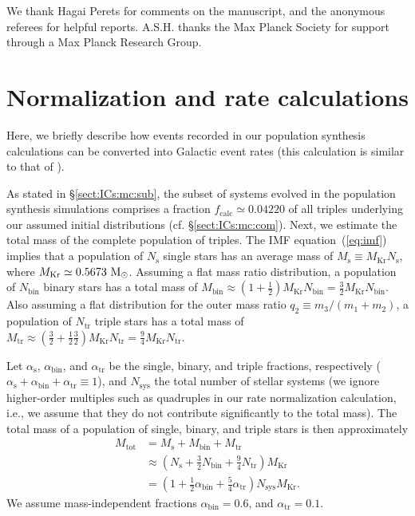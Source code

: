 \documentclass[twocolumn,appendixfloats,tighten]{aastex631}
\def\msun{{\rm\,M_\odot}}
\newcommand{\eq}{equation}
\begin{document}
\begin{acknowledgements} 
We thank Hagai Perets for comments on the manuscript, and the anonymous referees for helpful reports. A.S.H. thanks the Max Planck Society for support through a Max Planck Research Group.
\end{acknowledgements}




\appendix

\section{Normalization and rate calculations}
\label{app:norm}
Here, we briefly describe how events recorded in our population synthesis calculations can be converted into Galactic event rates (this calculation is similar to that of \citealt{2021arXiv210713620H}).

As stated in \S\ref{sect:ICs:mc:sub}, the subset of systems evolved in the population synthesis simulations comprises a fraction $f_\mathrm{calc} \simeq 0.04220$ of all triples underlying our assumed initial distributions (cf. \S\ref{sect:ICs:mc:com}). Next, we estimate the total mass of the complete population of triples. The IMF \eq~(\ref{eq:imf}) implies that a population of $N_\mathrm{s}$ single stars has an average mass of $M_\mathrm{s} \equiv M_\mathrm{Kr} N_\mathrm{s}$, where $M_\mathrm{Kr} \simeq 0.5673 \, \msun$. Assuming a flat mass ratio distribution, a population of $N_\mathrm{bin}$ binary stars has a total mass of $M_\mathrm{bin} \approx (1+\frac{1}{2} ) M_\mathrm{Kr} N_\mathrm{bin} = \frac{3}{2} M_\mathrm{Kr} N_\mathrm{bin}$. Also assuming a flat distribution for the outer mass ratio $q_2 \equiv m_3/(m_1+m_2)$, a population of $N_\mathrm{tr}$ triple stars has a total mass of $M_\mathrm{tr} \approx (\frac{3}{2} + \frac{1}{2} \frac{3}{2} ) M_\mathrm{Kr} N_\mathrm{tr} = \frac{9}{4} M_\mathrm{Kr} N_\mathrm{tr}$. 

Let $\alpha_\mathrm{s}$, $\alpha_\mathrm{bin}$, and $\alpha_\mathrm{tr}$ be the single, binary, and triple fractions, respectively ($\alpha_\mathrm{s} + \alpha_\mathrm{bin} + \alpha_\mathrm{tr} \equiv 1$), and $N_\mathrm{sys}$ the total number of stellar systems (we ignore higher-order multiples such as quadruples in our rate normalization calculation, i.e., we assume that they do not contribute significantly to the total mass). The total mass of a population of single, binary, and triple stars is then approximately
\begin{align}
\nonumber M_\mathrm{tot} & = M_\mathrm{s} + M_\mathrm{bin} + M_\mathrm{tr} \\
\nonumber &\approx \left (N_\mathrm{s} + \frac{3}{2} N_\mathrm{bin} + \frac{9}{4} N_\mathrm{tr} \right ) M_\mathrm{Kr} \\
 &= \left (1 + \frac{1}{2} \alpha_\mathrm{bin} + \frac{5}{4} \alpha_\mathrm{tr} \right) N_\mathrm{sys} M_\mathrm{Kr}.
\end{align}
We assume mass-independent fractions $\alpha_\mathrm{bin} = 0.6$, and $\alpha_\mathrm{tr} = 0.1$. 
\end{document}
